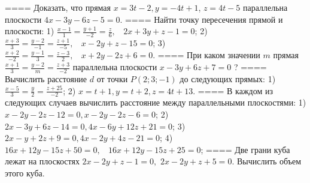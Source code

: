 ====
Доказать, что прямая \(x = 3t - 2,y = - 4t + 1\), \(z = 4t - 5\) параллельна плоскости \(4x - 3y - 6z - 5 = 0\).
====
Найти точку пересечения прямой и плоскости: 1) \(\frac{x - 1}{1} = \frac{y + 1}{- 2} = \frac{z}{6},\ \ \ \ 2x + 3y + z - 1 = 0\); 2) \(\frac{x + 3}{3} = \frac{y - 2}{- 1} = \frac{z + 1}{- 5},\ \ \ \ x - 2y + z - 15 = 0\); 3) \(\frac{x + 2}{- 2} = \frac{y - 1}{3} = \frac{z - 3}{2},\ \ \ \ x + 2y - 2z + 6 = 0\).
====
При каком значении \(m\) прямая \(\frac{x + 1}{3} = \frac{y - 2}{m} = \frac{z + 3}{- 2}\) параллельна плоскости \(x - 3y + 6z + 7 = 0\) ?
====
Вычислить расстояние \(d\) от точки \(P(2;3; - 1)\) до следующих прямых: 1) \(\frac{x - 5}{3} = \frac{y}{2} = \frac{z + 25}{- 2}\); 2) \(x = t + 1,y = t + 2,z = 4t + 13\).
====
В каждом из следующих случаев вычислить расстояние между параллельными плоскостями: 1) \(x - 2y - 2z - 12 = 0,x - 2y - 2z - 6 = 0\); 2) \(2x - 3y + 6z - 14 = 0,4x - 6y + 12z + 21 = 0\); 3) \(2x - y + 2z + 9 = 0,4x - 2y + 4z - 21 = 0\); 4) \(16x + 12y - 15z + 50 = 0,\ \ \ \ 16x + 12y - 15z + 25 = 0\);
====
Две грани куба лежат на плоскостях \(2x - 2y + z - 1 = 0,\) \(2x - 2y + z + 5 = 0\). Вычислить объем этого куба.
